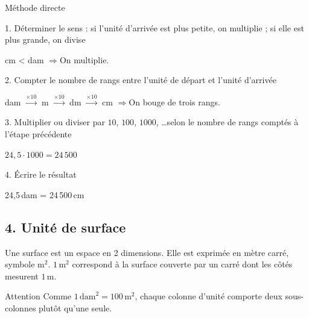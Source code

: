 \vfill
\textcolor{themeColor}{Méthode directe}

1. Déterminer le sens : si l'unité d'arrivée est plus petite, on multiplie ; si elle est plus grande, on divise

cm < dam \quad$\Longrightarrow$\quad On multiplie.

\vspace{10pt}
2. Compter le nombre de rangs entre l'unité de départ et l'unité d'arrivée

dam $\xrightarrow{\times 10}$ m $\xrightarrow{\times 10}$ dm $\xrightarrow{\times 10}$ cm \quad$\Longrightarrow$\quad On bouge de trois rangs.

\vspace{10pt}
3. Multiplier ou diviser par $10$, $100$, $1000$, \ldots selon le nombre de rangs comptés à l'étape précédente

$24,5 \cdot 1000 = 24\,500$

\vspace{10pt}
4. Écrire le résultat

24,5\,dam = 24\,500\,cm

\newpage
\subsection*{4. Unité de surface}

Une surface est un espace en 2 dimensions. Elle est exprimée en \textcolor{themeColor}{mètre carré, symbole m$^2$}. $1\,\text{m}^2$ correspond à la surface couverte par un carré dont les côtés mesurent $1\,\text{m}$.

\vfill
\begin{center}
\end{center}


\vfill
\begin{astuce}{Attention}
Comme $1\,\text{dam}^2 = 100\,\text{m}^2$, chaque colonne d'unité comporte \textcolor{themeColor}{deux sous-colonnes} plutôt qu'une seule.
\end{astuce}

